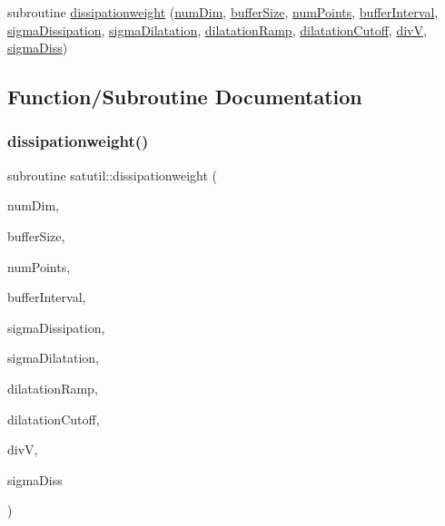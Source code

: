 \begin{DoxyCompactItemize}
subroutine \hyperlink{namespacesatutil_aeb5ee0c038617a221723c0e126d94204}{dissipationweight} (\hyperlink{SATKernels_8H_a680185db8546de161968dabace9e94f1}{num\+Dim}, \hyperlink{SpecialKernels_8H_aa9426cdf16e85054db35e88f9b68c6be}{buffer\+Size}, \hyperlink{ViscidKernels_8H_adf0bf75d0875d1bb42a5348bee7b7bfd}{num\+Points}, \hyperlink{WENOKernels_8H_ad1001168d5432b52e6d0636f4dc0e60c}{buffer\+Interval}, \hyperlink{SATKernels_8H_a37f2683de24db9314043c0908d11292c}{sigma\+Dissipation}, \hyperlink{SATKernels_8H_a1657cf7729fe0b6d5d9a412ecab80002}{sigma\+Dilatation}, \hyperlink{SATKernels_8H_ac59bb34f1cc96772cd2ff3b13a040a57}{dilatation\+Ramp}, \hyperlink{SATKernels_8H_afe603e2783dc402c56709682a723b77e}{dilatation\+Cutoff}, \hyperlink{SATKernels_8H_a7e17251bb9d4e0676024410ca03462c7}{divV}, \hyperlink{SATKernels_8H_a4f33b7bbf46dad9ee0eb31f6a0340d7a}{sigma\+Diss})
\end{DoxyCompactItemize}


\subsection{Function/\+Subroutine Documentation}
\hypertarget{namespacesatutil_aeb5ee0c038617a221723c0e126d94204}{}\label{namespacesatutil_aeb5ee0c038617a221723c0e126d94204} 
\subsubsection{\texorpdfstring{dissipationweight()}{dissipationweight()}}
{\footnotesize\ttfamily subroutine satutil\+::dissipationweight (\begin{DoxyParamCaption}\item[{integer(kind=4), intent(in)}]{num\+Dim,  }\item[{integer(kind=8), dimension(numdim), intent(in)}]{buffer\+Size,  }\item[{integer(kind=8), intent(in)}]{num\+Points,  }\item[{integer(kind=8), dimension(2$\ast$numdim), intent(in)}]{buffer\+Interval,  }\item[{real(kind=8), intent(in)}]{sigma\+Dissipation,  }\item[{real(kind=8), intent(in)}]{sigma\+Dilatation,  }\item[{real(kind=8), intent(in)}]{dilatation\+Ramp,  }\item[{real(kind=8), intent(in)}]{dilatation\+Cutoff,  }\item[{real(kind=8), dimension(numpoints), intent(in)}]{divV,  }\item[{real(kind=8), dimension(numpoints), intent(out)}]{sigma\+Diss }\end{DoxyParamCaption})}



